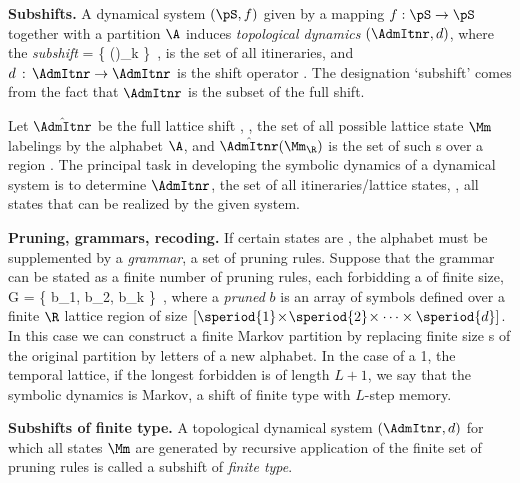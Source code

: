 {\bf Subshifts.}
A dynamical system $(\pS,f)$ given by a mapping $f : \pS \to \pS$
together with a {partition} $\A$ induces {\em topological dynamics}
$(\AdmItnr,\shift{})$, where the {\em subshift}
\beq
\AdmItnr = \{  ()_{k\in \integers} \}
\,,
is the set of all {\em \admissible} itineraries, and
$ \shift{} \,:\, \AdmItnr \to \AdmItnr $ is the shift
operator .
The designation `subshift' comes from the fact that
$\AdmItnr$  %
 is the subset of the full shift.

Let $\hat{\AdmItnr}$ be the full lattice shift  , \ie,
the set of all possible lattice state $\Mm$ labelings by the alphabet
$\A$, and $\hat{\AdmItnr}(\Mm_{\R})$ is
the set of such {\brick s} over a region {\R}. The principal task
in developing the symbolic dynamics of a dynamical system is to determine
$\AdmItnr$, the set of all \emph{{\admissible}} itineraries/lattice states,
\ie, all states that can be realized by the given system.

{\bf Pruning, grammars, recoding.}
If certain states are {\inadmissible}, the alphabet must be supplemented by a
{\em grammar},
a set of pruning rules.
Suppose that
the grammar can be stated as a finite number of pruning rules, each
forbidding a {\brick} of finite size,
\beq
 {\cal G} = \left\{
        b_1, b_2, \cdots b_k
        \right\}
\,,
where a {\em pruned {\brick}} $b$ is an array of symbols defined over a
finite $\R$ lattice region of size
$[\speriod{1}\!\times\!\speriod{2}\!\times\cdots\times\speriod{d}]$. In
this case we can construct a finite Markov partition by replacing finite
size \brick s of the original partition by letters of a new alphabet. In
the case of a 1\dmn, the temporal lattice, if the longest forbidden {\brick}
is of length $L+1$, we say that the symbolic dynamics is Markov, a shift
of finite type with {$L$-step memory}.

{\bf Subshifts of finite type.}
A {topological dynamical system} $(\AdmItnr,\shift{})$ for which all
{\admissible} states $\Mm$ are generated by recursive application
of the finite set of pruning rules 
is called a subshift of {\em finite type}.

